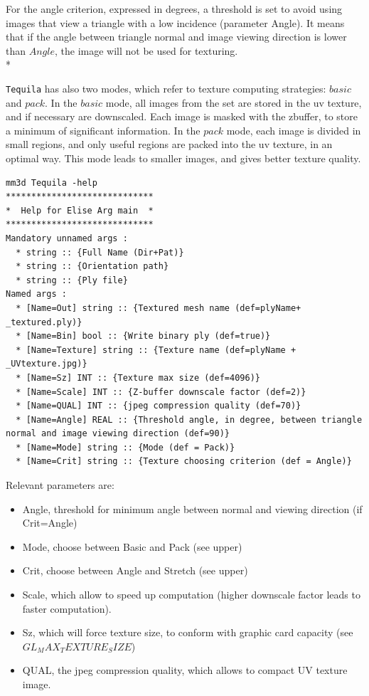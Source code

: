 For the angle criterion, expressed in degrees, a threshold is set to avoid using images that view a triangle with a low incidence (parameter Angle).
It means that if the angle between triangle normal and image viewing direction is lower than $Angle$, the image will not be used for texturing.\\*

{\tt Tequila} has also two modes, which refer to texture computing strategies: $basic$ and $pack$. In the $basic$ mode, all images from the set are stored in the uv texture, and if necessary are downscaled. Each image is masked with the zbuffer, to store a minimum of significant information.
In the $pack$ mode, each image is divided in small regions, and only useful regions are packed into the uv texture, in an optimal way. This mode leads to smaller images, and gives better texture quality.

\begin{verbatim}
mm3d Tequila -help
*****************************
*  Help for Elise Arg main  *
*****************************
Mandatory unnamed args :
  * string :: {Full Name (Dir+Pat)}
  * string :: {Orientation path}
  * string :: {Ply file}
Named args :
  * [Name=Out] string :: {Textured mesh name (def=plyName+ _textured.ply)}
  * [Name=Bin] bool :: {Write binary ply (def=true)}
  * [Name=Texture] string :: {Texture name (def=plyName + _UVtexture.jpg)}
  * [Name=Sz] INT :: {Texture max size (def=4096)}
  * [Name=Scale] INT :: {Z-buffer downscale factor (def=2)}
  * [Name=QUAL] INT :: {jpeg compression quality (def=70)}
  * [Name=Angle] REAL :: {Threshold angle, in degree, between triangle normal and image viewing direction (def=90)}
  * [Name=Mode] string :: {Mode (def = Pack)}
  * [Name=Crit] string :: {Texture choosing criterion (def = Angle)}
\end{verbatim}

Relevant parameters are:
\begin{itemize}
\item Angle, threshold for minimum angle between normal and viewing direction (if Crit=Angle)
\item Mode, choose between Basic and Pack (see upper)
\item Crit, choose between Angle and Stretch (see upper)
\item Scale, which allow to speed up computation (higher downscale factor leads to faster computation).
\item Sz, which will force texture size, to conform with graphic card capacity (see $GL_MAX_TEXTURE_SIZE$)
\item QUAL, the jpeg compression quality, which allows to compact UV texture image.
\end{itemize}

